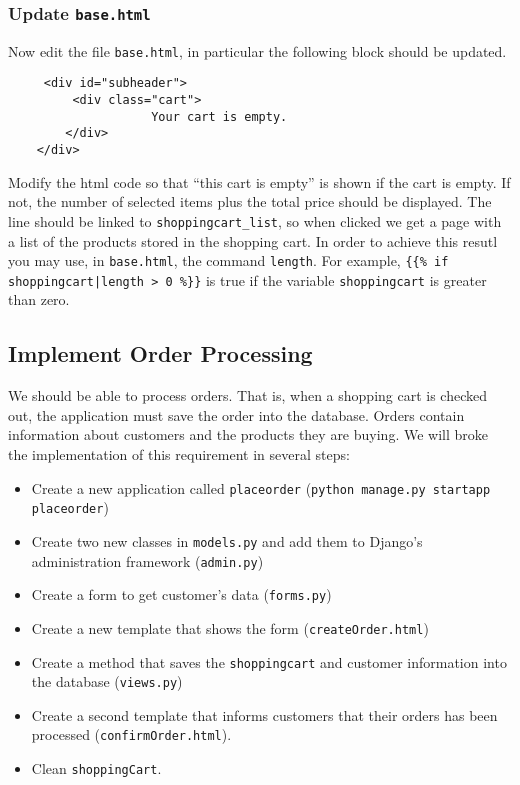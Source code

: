 \documentclass[12pt]{article} %
\newcommand{\ttt}[1]{\texttt{#1}}%
\newcommand{\hhh}[1]{\texttt{#1}}%
\newcommand{\views}{\texttt{views.py}}%
\newcommand{\modelss}{\texttt{models.py}}%
\newcommand{\forms}{\texttt{forms.py}}%
\newcommand{\admin}{\texttt{admin.py}}%
\begin{document}
\subsubsection{Update \hhh{base.html}}
Now edit the file \hhh{base.html}, in particular the following block should be updated.

\begin{lstlisting}
     <div id="subheader">
         <div class="cart">
                    Your cart is empty.
        </div>
    </div>
\end{lstlisting}
Modify the html code so that  ``this cart is empty'' is shown if the cart is empty.
If not, the number of selected items plus the total price should be displayed. The line should be linked to \ttt{shoppingcart\_list}, so when clicked we get a page with a list of the products stored in the shopping cart. In order to achieve this resutl you may use,
in \hhh{base.html}, the command \ttt{length}. For example, \ttt{\{\{\% if shoppingcart|length > 0 \%\}\}} is true if the variable  \ttt{shoppingcart} is greater than zero.

\subsection{Implement Order Processing}
We should be able to process orders. That is, when a shopping cart is checked out, the application must save the order into the database. Orders contain information about customers and the products they are buying. We will broke the implementation of this requirement in several steps:


\begin{itemize}
 \item Create a new application called \ttt{placeorder} (\ttt{python manage.py startapp placeorder})
 \item Create two new classes in \modelss{} and add them to Django's administration framework (\admin)
 \item Create a form to get customer's data (\forms)
 \item Create a new template that shows the form (\hhh{createOrder.html})
 \item Create a method that saves the \ttt{shoppingcart} and customer information into the database (\views)
 \item Create a second template that informs customers that their orders has been processed (\hhh{confirmOrder.html}).
 \item Clean \ttt{shoppingCart}.

\end{itemize}
\end{document}
